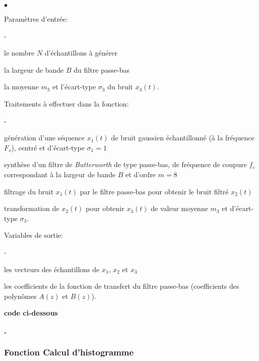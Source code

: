 \documentclass{article}
\newcommand{\debutrep}[1]{\color{blue}\begin{center} \hrulefill \textbf{ #1 } \hrulefill \end{center} }
\newcommand{\finrep}{\vspace*{5mm}\hfill $\square$\color{black}\vspace*{5mm}}
\begin{document}
\begin{list}{$\bullet$}{\setlength{\leftmargin}{3mm} \setlength{\labelwidth}{20mm} \setlength{\labelsep}{2mm} \setlength{\itemsep}{1mm} }
\item Paramètres d'entrée:
\begin{list}{-}{\setlength{\leftmargin}{3mm} \setlength{\labelwidth}{20mm} \setlength{\labelsep}{2mm} \setlength{\itemsep}{1mm} }
\item le nombre $N$ d'échantillons à générer
\item la largeur de bande $B$ du filtre passe-bas
\item la moyenne $m_3$ et l'écart-type $\sigma_3$ du bruit $x_3(t)$.
\end{list}
\item Traitements à effectuer dans la fonction:
\begin{list}{-}{\setlength{\leftmargin}{3mm} \setlength{\labelwidth}{20mm} \setlength{\labelsep}{2mm} \setlength{\itemsep}{1mm} }
\item génération d'une séquence $x_1(t)$ de bruit gaussien échantillonné (à la fréquence $F_s$), centré et d'écart-type $\sigma_1=1$
\item synthèse d'un filtre de {\em Butterworth} de type passe-bas, de fréquence de coupure $f_c$ correspondant à la largeur de bande $B$ et d'ordre $m=8$
\item filtrage du bruit $x_1(t)$ par le filtre passe-bas pour obtenir le bruit filtré $x_2(t)$
\item transformation de $x_2(t)$ pour obtenir $x_3(t)$ de  valeur moyenne $m_3$ et d'écart-type $\sigma_3$.
\end{list}
\item Variables de sortie:
\begin{list}{-}{\setlength{\leftmargin}{3mm} \setlength{\labelwidth}{20mm} \setlength{\labelsep}{2mm} \setlength{\itemsep}{1mm} }
\item les vecteurs des échantillons de $x_1$, $x_2$ et $x_3$
\item les coefficients de la fonction de transfert du filtre passe-bas (coefficients des polynômes $A(z)$ et $B(z)$).
\end{list}
\end{list}


\debutrep{code ci-dessous}
 \begin{verbatim}

 \end{verbatim}
\finrep
 
\subsubsection{Fonction Calcul d'histogramme}
\end{document}
